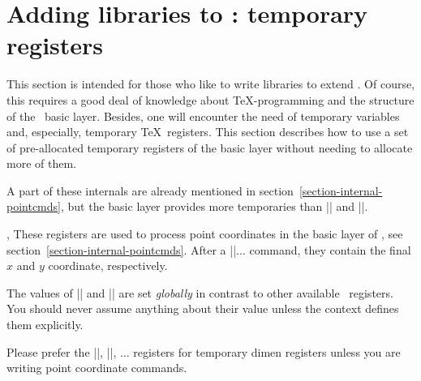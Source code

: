 %
%
%


\section{Adding libraries to \pgfname: temporary registers}

\label{section-internal-registers}

This section is intended for those who like to write libraries to extend \pgfname. Of course, this requires a good deal of knowledge about \TeX-programming and the structure of the \pgfname\ basic layer. Besides, one will encounter the need of temporary variables and, especially, temporary \TeX\ registers. This section describes how to use a set of pre-allocated temporary registers of the basic layer without needing to allocate more of them.

A part of these internals are already mentioned in section~\ref{section-internal-pointcmds}, but the basic layer provides more temporaries than |\pgf@x| and |\pgf@y|.

\begin{internallist}{\pgf@x,\pgf@y}
	These registers are used to process point coordinates in the basic layer of \pgfname, see section~\ref{section-internal-pointcmds}. After a |\pgfpoint|$\dotsc$ command, they contain the final $x$ and $y$ coordinate, respectively.

	The values of |\pgf@x| and |\pgf@y| are set \emph{globally} in contrast to other available \pgfname\ registers. You should never assume anything about their value unless the context defines them explicitly.


	Please prefer the |\pgf@xa|, |\pgf@xb|, $\dotsc$ registers for temporary dimen registers unless you are writing point coordinate commands.
\end{internallist}

